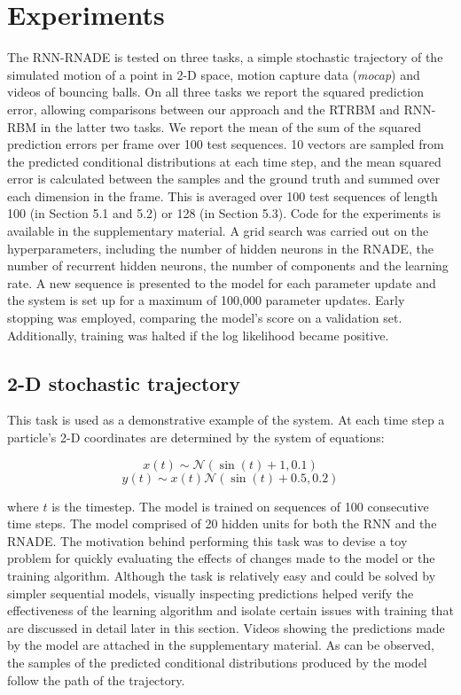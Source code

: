 \documentclass{article} %
\begin{document}
\section{Experiments}
\label{Experiments}
The RNN-RNADE is tested on three tasks, a simple stochastic trajectory of the simulated motion of a point in 2-D space, motion capture data ({\it mocap}) and videos of bouncing balls. On all three tasks we report the squared prediction error, allowing comparisons between our approach and the RTRBM and RNN-RBM in the latter two tasks. We report the mean of the sum of the squared prediction errors per frame over 100 test sequences. 10 vectors are sampled from the predicted conditional distributions at each time step, and the mean squared error is calculated between the samples and the ground truth and summed over each dimension in the frame. This is averaged over 100 test sequences of length 100 (in Section 5.1 and 5.2) or 128 (in Section 5.3). Code for the experiments is available in the supplementary material.  A grid search was carried out on the hyperparameters, including the number of hidden neurons in the RNADE, the number of recurrent hidden neurons, the number of components and the learning rate. A new sequence is presented to the model for each parameter update and the system is set up for a maximum of 100,000 parameter updates. Early stopping was employed, comparing the model's score on a validation set. Additionally, training was halted if the log likelihood became positive.


\subsection{2-D stochastic trajectory}
This task is used as a demonstrative example of the system. At each time step a particle's 2-D coordinates are determined by the system of equations:


$$x(t) \sim \mathcal{N}(\sin(t)+1,0.1) $$
$$ y(t) \sim x(t)\mathcal{N}(\sin(t)+0.5,0.2)$$


where $t$ is the timestep. The model is trained on sequences of 100 consecutive time steps. The model comprised of 20 hidden units for both the RNN and the RNADE. The motivation behind performing this task was to devise a toy problem for quickly evaluating the effects of changes made to the model or the training algorithm. Although the task is relatively easy and could be solved by simpler sequential models, visually inspecting predictions helped verify the effectiveness of the learning algorithm and isolate certain issues with training that are discussed in detail later in this section. Videos showing the predictions made by the model are attached in the supplementary material. As can be observed, the samples of the predicted conditional distributions produced by the model follow the path of the trajectory.
\end{document}
